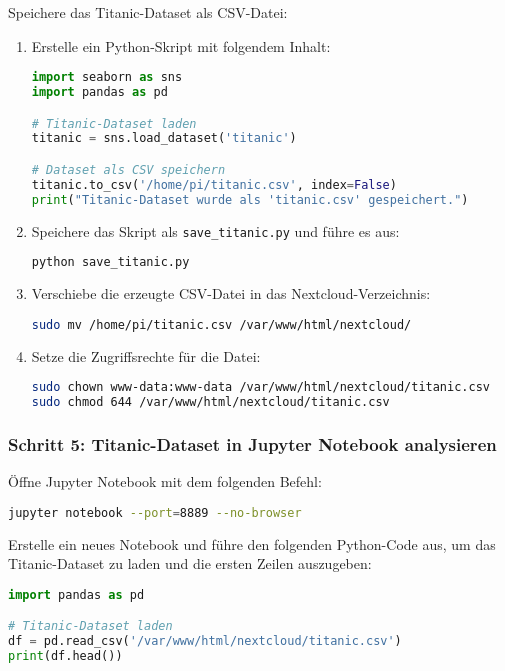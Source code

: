 \documentclass[a4paper,12pt]{article}
\begin{document}
Speichere das Titanic-Dataset als CSV-Datei:
\begin{enumerate}
    \item Erstelle ein Python-Skript mit folgendem Inhalt:
\begin{lstlisting}[language=Python]
import seaborn as sns
import pandas as pd

# Titanic-Dataset laden
titanic = sns.load_dataset('titanic')

# Dataset als CSV speichern
titanic.to_csv('/home/pi/titanic.csv', index=False)
print("Titanic-Dataset wurde als 'titanic.csv' gespeichert.")
\end{lstlisting}

    \item Speichere das Skript als \texttt{save\_titanic.py} und führe es aus:
\begin{lstlisting}[language=bash]
python save_titanic.py
\end{lstlisting}

    \item Verschiebe die erzeugte CSV-Datei in das Nextcloud-Verzeichnis:
\begin{lstlisting}[language=bash]
sudo mv /home/pi/titanic.csv /var/www/html/nextcloud/
\end{lstlisting}

    \item Setze die Zugriffsrechte für die Datei:
\begin{lstlisting}[language=bash]
sudo chown www-data:www-data /var/www/html/nextcloud/titanic.csv
sudo chmod 644 /var/www/html/nextcloud/titanic.csv
\end{lstlisting}
\end{enumerate}

\subsubsection{Schritt 5: Titanic-Dataset in Jupyter Notebook analysieren}
Öffne Jupyter Notebook mit dem folgenden Befehl:
\begin{lstlisting}[language=bash]
jupyter notebook --port=8889 --no-browser
\end{lstlisting}

\noindent
Erstelle ein neues Notebook und führe den folgenden Python-Code aus, um das Titanic-Dataset zu laden und die ersten Zeilen auszugeben:
\begin{lstlisting}[language=Python]
import pandas as pd

# Titanic-Dataset laden
df = pd.read_csv('/var/www/html/nextcloud/titanic.csv')
print(df.head())
\end{lstlisting}
\end{document}
